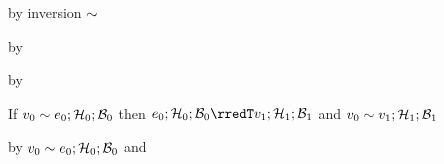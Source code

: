 \begin{lamportproof}
    \begin{pfproof}
      \qedstep
        \begin{pfproof}
          by inversion $\sim$
        \end{pfproof}
    \end{pfproof}

    \begin{pfproof}
      \qedstep
        \begin{pfproof}
          by 
        \end{pfproof}
    \end{pfproof}

    \begin{pfproof}
      \qedstep
        \begin{pfproof}
          by 
        \end{pfproof}
    \end{pfproof}

\end{lamportproof}

\begin{lemma}\label{AT-A-value}
  If\/ $v_0 \sim e_0; \mathcal{H}_0; \mathcal{B}_0$
  then\/ $\conf{\sexpr_0}{\vstore_0}{\bstore_0} \rredT \conf{\svalue_1}{\vstore_1}{\bstore_1}$
  and\/ $v_0 \sim v_1; \mathcal{H}_1; \mathcal{B}_1$
\end{lemma}
\begin{lamportproof}
    \begin{pfproof}
      \qedstep
    \end{pfproof}

    \begin{pfproof}
      \qedstep
        \begin{pfproof}
          by $v_0 \sim e_0; \mathcal{H}_0; \mathcal{B}_0$ and 
        \end{pfproof}
    \end{pfproof}
\end{lamportproof}

